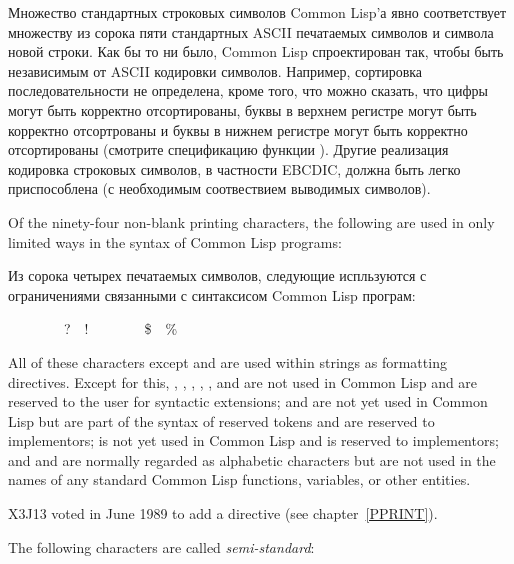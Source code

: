 Множество стандартных строковых символов Common Lisp'а явно соответствует
множеству из сорока пяти стандартных ASCII печатаемых символов и символа новой
строки. Как бы то ни было, Common Lisp спроектирован так, чтобы быть независимым
от ASCII кодировки символов. Например, сортировка последовательности не
определена, кроме того, что можно сказать, что цифры могут быть корректно
отсортированы, буквы в верхнем регистре могут быть корректно отсортрованы и
буквы в нижнем регистре могут быть корректно отсортированы (смотрите
спецификацию функции ). Другие реализация кодировка строковых
символов, в частности EBCDIC, должна быть легко приспособлена (с необходимым
соотвествием выводимых символов).

Of the ninety-four non-blank printing characters, the following are
used in only limited ways in the syntax of Common Lisp programs:

Из сорока четырех печатаемых символов, следующие испльзуются с ограничениями
связанными с синтаксисом Common Lisp програм:
\begin{lisp}
{\Xlbracket}~~{\Xrbracket}~~{\Xlbrace}~~{\Xrbrace}~~?~~!~~{\Xcircumflex}~~{\Xunderscore}~~{\Xtilde}~~\$~~\% 
\end{lisp}

\begin{obsolete}
\noindent
All of these characters except \cd{!} and \cd{{\Xunderscore}} are used within
 strings as formatting directives.
Except for this,
\cd{{\Xlbracket}}, \cd{{\Xrbracket}}, \cd{{\Xlbrace}}, \cd{{\Xrbrace}},
, and \cd{!} are not used in Common Lisp and are reserved to the user
for syntactic extensions; \cd{{\Xcircumflex}} and \cd{{\Xunderscore}}
are not yet used in Common Lisp
but are part of the syntax of reserved tokens
and are reserved to implementors;
\cd{{\Xtilde}} is not yet used in Common Lisp and is reserved to implementors;
and \cd{\$} and \cd{\%} are normally regarded as alphabetic characters
but are not used in the names of any standard Common Lisp functions,
variables, or other entities.
\end{obsolete}

\begin{newer}
X3J13 voted in June 1989 
to add a  directive \cd{{\Xtilde}{\Xunderscore}} (see chapter~\ref{PPRINT}).
\end{newer}

The following characters are called \emph{semi-standard}:

